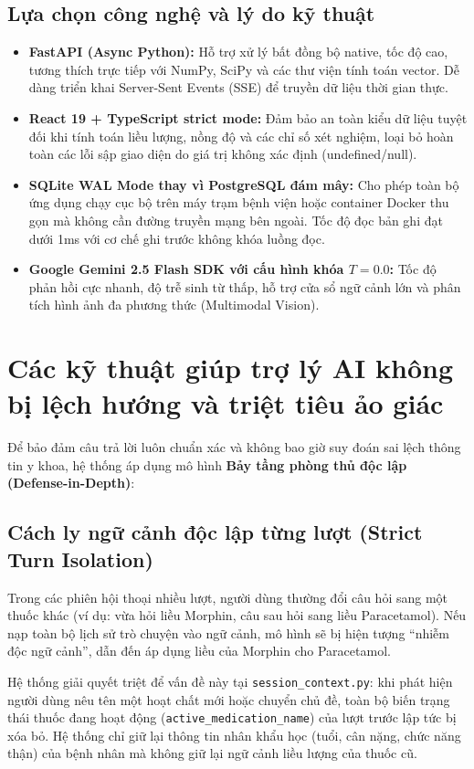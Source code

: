 \documentclass[12pt,a4paper]{article}
\begin{document}
\subsection{Lựa chọn công nghệ và lý do kỹ thuật}
\begin{itemize}[leftmargin=1.5em]
    \item \textbf{FastAPI (Async Python):} Hỗ trợ xử lý bất đồng bộ native, tốc độ cao, tương thích trực tiếp với NumPy, SciPy và các thư viện tính toán vector. Dễ dàng triển khai Server-Sent Events (SSE) để truyền dữ liệu thời gian thực.
    \item \textbf{React 19 + TypeScript strict mode:} Đảm bảo an toàn kiểu dữ liệu tuyệt đối khi tính toán liều lượng, nồng độ và các chỉ số xét nghiệm, loại bỏ hoàn toàn các lỗi sập giao diện do giá trị không xác định (undefined/null).
    \item \textbf{SQLite WAL Mode thay vì PostgreSQL đám mây:} Cho phép toàn bộ ứng dụng chạy cục bộ trên máy trạm bệnh viện hoặc container Docker thu gọn mà không cần đường truyền mạng bên ngoài. Tốc độ đọc bản ghi đạt dưới 1ms với cơ chế ghi trước không khóa luồng đọc.
    \item \textbf{Google Gemini 2.5 Flash SDK với cấu hình khóa $T = 0.0$:} Tốc độ phản hồi cực nhanh, độ trễ sinh từ thấp, hỗ trợ cửa sổ ngữ cảnh lớn và phân tích hình ảnh đa phương thức (Multimodal Vision).
\end{itemize}

\section{Các kỹ thuật giúp trợ lý AI không bị lệch hướng và triệt tiêu ảo giác}

Để bảo đảm câu trả lời luôn chuẩn xác và không bao giờ suy đoán sai lệch thông tin y khoa, hệ thống áp dụng mô hình \textbf{Bảy tầng phòng thủ độc lập (Defense-in-Depth)}:

\subsection{Cách ly ngữ cảnh độc lập từng lượt (Strict Turn Isolation)}
Trong các phiên hội thoại nhiều lượt, người dùng thường đổi câu hỏi sang một thuốc khác (ví dụ: vừa hỏi liều Morphin, câu sau hỏi sang liều Paracetamol). Nếu nạp toàn bộ lịch sử trò chuyện vào ngữ cảnh, mô hình sẽ bị hiện tượng ``nhiễm độc ngữ cảnh'', dẫn đến áp dụng liều của Morphin cho Paracetamol. 

Hệ thống giải quyết triệt để vấn đề này tại \texttt{session\_context.py}: khi phát hiện người dùng nêu tên một hoạt chất mới hoặc chuyển chủ đề, toàn bộ biến trạng thái thuốc đang hoạt động (\texttt{active\_medication\_name}) của lượt trước lập tức bị xóa bỏ. Hệ thống chỉ giữ lại thông tin nhân khẩu học (tuổi, cân nặng, chức năng thận) của bệnh nhân mà không giữ lại ngữ cảnh liều lượng của thuốc cũ.
\end{document}
